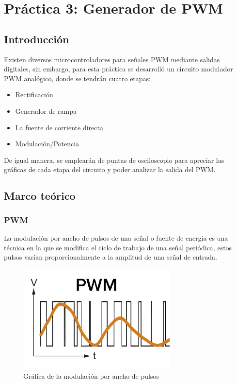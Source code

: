 \clearpage

\section{Práctica 3: Generador de PWM}

\subsection{Introducción}

Existen diversos microcontroladores para señales PWM mediante salidas digitales, sin embargo, para esta práctica se desarrolló un circuito modulador PWM analógico, donde se tendrán
cuatro etapas:

\begin{itemize}
    \item Rectificación
    \item Generador de rampa
    \item La fuente de corriente directa
    \item Modulación/Potencia
\end{itemize}

De igual manera, se emplearán de puntas de osciloscopio para apreciar las gráficas de cada etapa del circuito y poder analizar la salida del PWM.

\subsection{Marco teórico}

\subsubsection{PWM}

La modulación por ancho de pulsos de una señal o fuente de energía es una técnica en la que se modifica el ciclo de trabajo de una señal periódica, estos pulsos varían proporcionalmente
a la amplitud de una señal de entrada.

\begin{figure}[htb]
    \centering
    \includegraphics[width=8cm]{media/PWM.jpg}
    \caption{ Gráfica de la modulación por ancho de pulsos}
\end{figure}

